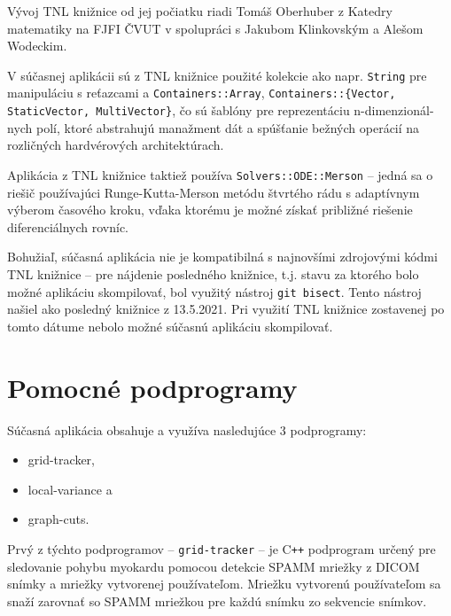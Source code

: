 Vývoj TNL knižnice od jej počiatku riadi Tomáš Oberhuber z Katedry matematiky na FJFI ČVUT v spolupráci s Jakubom Klinkovským a Alešom Wodeckim.

V súčasnej aplikácii sú z TNL knižnice použité kolekcie ako napr. \texttt{String} pre manipuláciu s reťazcami a \texttt{Containers::Array}, \texttt{Containers::\{Vector, StaticVector, MultiVector\}}, čo sú šablóny pre reprezentáciu n-dimenzionál-nych polí, ktoré abstrahujú manažment dát a spúšťanie bežných operácií na rozličných hardvérových architektúrach.

Aplikácia z TNL knižnice taktiež používa \texttt{Solvers::ODE::Merson} -- jedná sa o riešič používajúci Runge-Kutta-Merson metódu štvrtého rádu s adaptívnym výberom časového kroku, vďaka ktorému je možné získať približné riešenie diferenciálnych rovníc.

Bohužiaľ, súčasná aplikácia nie je kompatibilná s najnovšími zdrojovými kódmi TNL knižnice -- pre nájdenie posledného  knižnice, t.j. stavu za ktorého bolo možné aplikáciu skompilovať, bol využitý nástroj \texttt{git bisect}. Tento nástroj našiel ako posledný  knižnice z 13.5.2021. Pri využití TNL knižnice zostavenej po tomto dátume nebolo možné súčasnú aplikáciu skompilovať.

\clearpage

\section {Pomocné podprogramy}\label{helper_apps}
Súčasná aplikácia obsahuje a využíva nasledujúce 3 podprogramy:

\begin {itemize}
\item {grid-tracker,}
\item {local-variance a}
\item {graph-cuts.}
\end {itemize}

Prvý z týchto podprogramov -- \texttt{grid-tracker} -- je C\texttt{++} podprogram určený pre sledovanie pohybu myokardu pomocou detekcie SPAMM mriežky z DICOM snímky a mriežky vytvorenej používateľom. Mriežku vytvorenú používateľom sa snaží zarovnať so SPAMM mriežkou pre každú snímku zo sekvencie snímkov.

